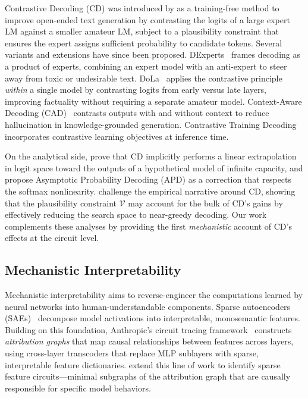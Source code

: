 \documentclass[11pt]{article}
\begin{document}
Contrastive Decoding (CD) was introduced by \citet{li2023contrastive} as a training-free method to improve open-ended text generation by contrasting the logits of a large expert LM against a smaller amateur LM, subject to a plausibility constraint that ensures the expert assigns sufficient probability to candidate tokens. Several variants and extensions have since been proposed. DExperts~\citep{liu2021dexperts} frames decoding as a product of experts, combining an expert model with an anti-expert to steer away from toxic or undesirable text. DoLa~\citep{chuang2024dola} applies the contrastive principle \emph{within} a single model by contrasting logits from early versus late layers, improving factuality without requiring a separate amateur model. Context-Aware Decoding (CAD)~\citep{shi2023cad} contrasts outputs with and without context to reduce hallucination in knowledge-grounded generation. Contrastive Training Decoding~\citep{su2024contrastive} incorporates contrastive learning objectives at inference time.

On the analytical side, \citet{chang2024explaining} prove that CD implicitly performs a linear extrapolation in logit space toward the outputs of a hypothetical model of infinite capacity, and propose Asymptotic Probability Decoding (APD) as a correction that respects the softmax nonlinearity. \citet{yin2025mirage} challenge the empirical narrative around CD, showing that the plausibility constraint $\mathcal{V}$ may account for the bulk of CD's gains by effectively reducing the search space to near-greedy decoding. Our work complements these analyses by providing the first \emph{mechanistic} account of CD's effects at the circuit level.

\subsection{Mechanistic Interpretability}

Mechanistic interpretability aims to reverse-engineer the computations learned by neural networks into human-understandable components. Sparse autoencoders (SAEs)~\citep{cunningham2023sparse} decompose model activations into interpretable, monosemantic features. Building on this foundation, Anthropic's circuit tracing framework~\citep{anthropic2025attribution} constructs \emph{attribution graphs} that map causal relationships between features across layers, using cross-layer transcoders that replace MLP sublayers with sparse, interpretable feature dictionaries. \citet{marks2025sparse} extend this line of work to identify sparse feature circuits---minimal subgraphs of the attribution graph that are causally responsible for specific model behaviors.
\end{document}
